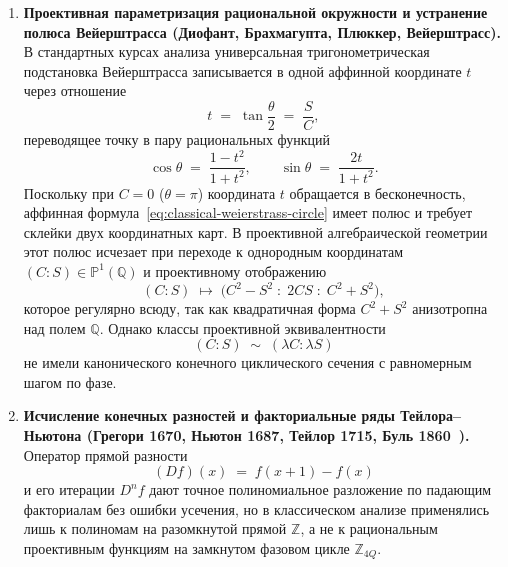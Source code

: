 \documentclass[11pt,a4paper]{article}
\theoremstyle{plain}
\theoremstyle{definition}
\begin{document}
\begin{enumerate}[label=\textbf{(\arabic*)},leftmargin=*]
\item \textbf{Проективная параметризация рациональной окружности и устранение полюса Вейерштрасса (Диофант, Брахмагупта, Плюккер, Вейерштрасс).}
  В стандартных курсах анализа универсальная тригонометрическая подстановка Вейерштрасса записывается в одной аффинной координате $t$ через отношение
  \begin{equation}
    \label{eq:classical-weierstrass-affine}
    t \;=\; \tan\frac{\theta}{2} \;=\; \frac{S}{C},
  \end{equation}
  переводящее точку в пару рациональных функций
  \begin{equation}
    \label{eq:classical-weierstrass-circle}
    \cos\theta \;=\; \frac{1 - t^2}{1 + t^2},
    \qquad
    \sin\theta \;=\; \frac{2t}{1 + t^2}.
  \end{equation}
  Поскольку при $C = 0$ ($\theta = \pi$) координата $t$ обращается в бесконечность, аффинная формула~\eqref{eq:classical-weierstrass-circle} имеет полюс и требует склейки двух координатных карт. В проективной алгебраической геометрии этот полюс исчезает при переходе к однородным координатам $(C : S) \in \mathbb{P}^1(\mathbb{Q})$ и проективному отображению
  \begin{equation}
    \label{eq:projective-weierstrass-map}
    (C : S) \;\longmapsto\; \bigl(C^2 - S^2 \;:\; 2CS \;:\; C^2 + S^2\bigr),
  \end{equation}
  которое регулярно всюду, так как квадратичная форма $C^2 + S^2$ анизотропна над полем $\mathbb{Q}$. Однако классы проективной эквивалентности
  \[
    (C : S) \;\sim\; (\lambda C : \lambda S)
  \]
  не имели канонического конечного циклического сечения с равномерным шагом по фазе.

\item \textbf{Исчисление конечных разностей и факториальные ряды Тейлора--Ньютона (Грегори 1670, Ньютон 1687, Тейлор 1715, Буль 1860~\cite{Boole1860}).}
  Оператор прямой разности
  \begin{equation}
    \label{eq:intro-forward-diff}
    (Df)(x) \;=\; f(x+1) - f(x)
  \end{equation}
  и его итерации $D^n f$ дают точное полиномиальное разложение по падающим факториалам без ошибки усечения, но в классическом анализе применялись лишь к полиномам на разомкнутой прямой $\mathbb{Z}$, а не к рациональным проективным функциям на замкнутом фазовом цикле $\mathbb{Z}_{4Q}$.


\end{enumerate}
\end{document}

